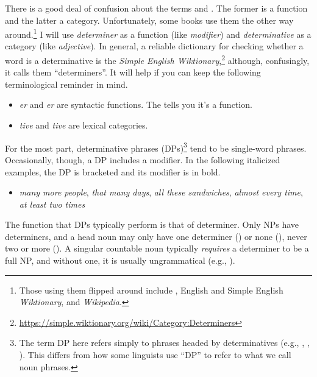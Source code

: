 There is a good deal of confusion about the terms  and . The former is a function and the latter a category. Unfortunately, some books use them the other way around.\footnote{Those using them flipped around include , English and Simple English \textit{Wiktionary}, and \textit{Wikipedia}.} I will use  \textit{determin\emph{er}} as a function (like  \textit{modifi\emph{er}}) and \textit{determina\emph{tive}} as a category (like \textit{adjec\emph{tive}}). In general, a reliable dictionary for checking whether a word is a determinative is the \textit{Simple English Wiktionary},\footnote{\url{https://simple.wiktionary.org/wiki/Category:Determiners}} although, confusingly, it calls them ``determiners''. It will help if you can keep the following terminological reminder in mind.

\begin{itemize}[noitemsep]
    \item {}\emph{er} and \emph{er} are syntactic functions. The  tells you it's a function.
    \item {}\emph{tive} and \emph{tive} are lexical categories.
\end{itemize}

For the most part, determinative phrases (DPs)\footnote{The term DP here refers simply to phrases headed by determinatives (e.g., , , ). This differs from how some linguists use ``DP'' to refer to what we call noun phrases.} tend to be single-word phrases. Occasionally, though, a DP includes a modifier. In the following italicized examples, the DP is bracketed and its modifier is in bold.

\begin{itemize}[noitemsep]
    \item \textit{\ob\emph{many} more{\cb} people},  \textit{\ob\emph{that} many{\cb} days},  \textit{\ob\emph{all} these{\cb} sandwiches}, \textit{\ob\emph{almost} every{\cb} time}, \textit{\ob\emph{at least} two{\cb} times}
\end{itemize}

The function that DPs typically perform is that of determiner. Only NPs have determiners, and a head noun may only have one determiner () or none (), never two or more (). A singular countable noun typically \emph{requires} a determiner to be a full NP, and without one, it is usually ungrammatical (e.g., ).

